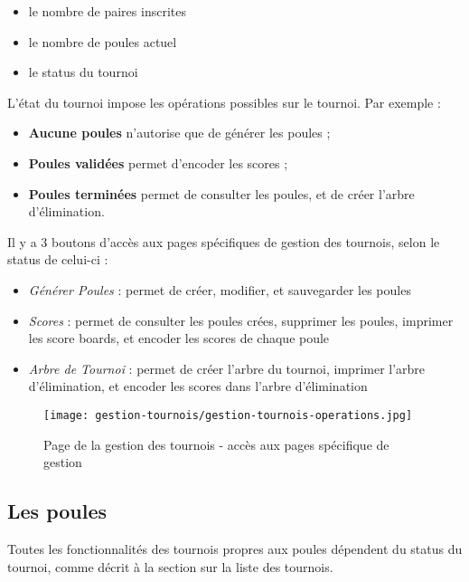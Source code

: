 \begin{itemize}
\item le nombre de paires inscrites
\item le nombre de poules actuel
\item le status du tournoi
\end{itemize}
\bigskip

L'état du tournoi impose les opérations possibles sur le tournoi. Par exemple :

\begin{itemize}
\item  \textbf{Aucune poules} n'autorise que de générer les poules ;
\item \textbf{Poules validées} permet d'encoder les scores ;
\item \textbf{Poules terminées} permet de consulter les poules, et de créer l'arbre d'élimination.
\end{itemize}
\bigskip

Il y a 3 boutons d'accès aux pages spécifiques de gestion des tournois, selon le status de celui-ci :

\begin{itemize}
\item \textit{Générer Poules} : permet de créer, modifier, et sauvegarder les poules
\item \textit{Scores} : permet de consulter les poules crées, supprimer les poules, imprimer les score boards, et encoder les scores de chaque poule
\item \textit{Arbre de Tournoi} : permet de créer l'arbre du tournoi, imprimer l'arbre d'élimination, et encoder les scores dans l'arbre d'élimination
\end{itemize}

\begin{figure}[H]
\centering
\texttt{[image: gestion-tournois/gestion-tournois-operations.jpg]}
\caption{Page de la gestion des tournois - accès aux pages spécifique de gestion}
\end{figure}

\subsection{Les poules}

Toutes les fonctionnalités des tournois propres aux poules dépendent du status du tournoi, comme décrit à la section sur la liste des tournois.
\bigskip

